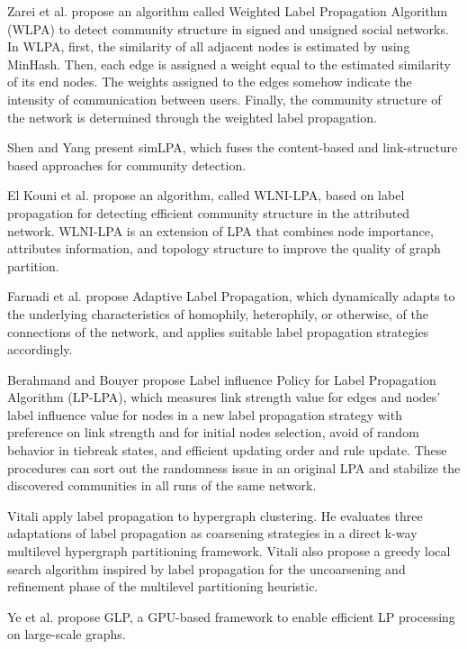 {Zarei et al. \cite{zarei2020detecting} propose an algorithm called Weighted Label Propagation Algorithm (WLPA) to detect community structure in signed and unsigned social networks. In WLPA, first, the similarity of all adjacent nodes is estimated by using MinHash. Then, each edge is assigned a
weight equal to the estimated similarity of its end nodes. The weights assigned to the edges somehow indicate the intensity of communication
between users. Finally, the community structure of the network is determined through the weighted label propagation.

Shen and Yang \cite{shen2016topic} present simLPA, which fuses the content-based and link-structure based approaches for community detection.

El Kouni et al. \cite{el2021wlni} propose an algorithm, called WLNI-LPA, based on label propagation for detecting efficient community structure in the attributed network. WLNI-LPA is an extension of LPA that combines node importance, attributes information, and topology structure to improve the quality of graph partition.

Farnadi et al. \cite{farnadi2015scalable} propose Adaptive Label Propagation, which dynamically adapts to the underlying characteristics of homophily, heterophily, or otherwise, of the connections of the network, and applies suitable label propagation strategies accordingly.

Berahmand and Bouyer \cite{berahmand2018lp} propose Label influence Policy for Label Propagation Algorithm (LP-LPA), which measures link strength value for edges and nodes’ label influence value for nodes in a new label propagation strategy with preference on link strength and for initial nodes selection, avoid of random behavior in tiebreak states, and efficient updating order and rule update. These procedures can sort out the randomness issue in an original LPA and stabilize the discovered communities in all runs of the same network.


Vitali \cite{henne2015label} apply label propagation to hypergraph clustering. He evaluates three adaptations of label propagation as coarsening strategies in a direct k-way multilevel hypergraph partitioning framework. Vitali also propose a greedy local search algorithm inspired by label propagation for the uncoarsening and refinement phase of the multilevel partitioning heuristic.

Ye et al. \cite{ye2023large} propose GLP, a GPU-based framework to enable efficient LP processing on large-scale graphs.

}
